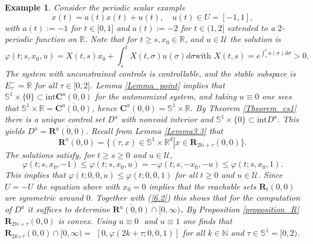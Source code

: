 \documentclass{siamltex}%
\newtheorem{example}[theorem]{Example}
\begin{document}
\begin{example}
\label{Example6.1}Consider the periodic scalar example%
\begin{equation}
\dot{x}(t)=a(t)x(t)+u(t),\quad u(t)\in U=[-1,1], \label{6.1}%
\end{equation}
with $a(t):=-1$ for $t\in\lbrack0,1]$ and $a(t):=-2$ for $t\in(1,2]$ extended
to a $2$-periodic function on $\mathbb{R}$. Note that for $t\geq s,x_{0}%
\in\mathbb{R}$, and $u\in\mathcal{U}$ the solution is%
\[
\varphi(t;s,x_{0},u)=X(t,s)x_{0}+\int_{s}^{t}X(t,\sigma)u(\sigma)d\sigma\text{
with }X(t,s)=e^{\int_{s}^{t}a(\sigma)d\sigma}>0.
\]
The system with unconstrained controls is controllable, and the stable
subspace is $E_{\tau}^{-}=\mathbb{R}$ for all $\tau\in\lbrack0,2]$. Lemma
\ref{Lemma_point} implies that $\mathbb{S}^{1}\times\{0\}\subset
\mathrm{int}\mathbf{C}^{a}(0,0)$ for the autonomized system, and taking
$u\equiv0$ one sees that $\mathbb{S}^{1}\times\mathbb{R}=\overline
{\mathbf{C}^{a}(0,0)}$, hence $\mathbf{C}^{a}(0,0)=\mathbb{S}^{1}%
\times\mathbb{R}$. By Theorem \ref{Theorem_cs1} there is a unique control set
$D^{a}$ with nonvoid interior and $\mathbb{S}^{1}\times\{0\}\subset
\mathrm{int}D^{a}$. This yields $D^{a}=\overline{\mathbf{R}^{a}(0,0)}$. Recall
from Lemma \ref{Lemma3.3} that%
\begin{equation}
\mathbf{R}^{a}(0,0)=\{(\tau,x)\in\mathbb{S}^{1}\times\mathbb{R}^{d}\left\vert
x\in\mathbf{R}_{2\mathbb{N+\tau}}(0,0)\right.  \}. \label{6.2}%
\end{equation}
The solutions satisfy, for $t\geq s\geq0$ and $u\in\mathcal{U}$,%
\[
\varphi(t;s,x_{0},-1)\leq\varphi(t;s,x_{0},u)=-\varphi(t;s,-x_{0}%
,-u)\leq\varphi(t;s,x_{0},1).
\]
This implies that $\varphi(t;0,0,u)\leq\varphi(t;0,0,1)$ for all $t\geq0$ and
$u\in\mathcal{U}$. Since $U=-U$ the equation above with $x_{0}=0$ implies that
the reachable sets $\mathbf{R}_{t}(0,0)$ are symmetric around $0$. Together
with (\ref{6.2}) this shows that for the computation of $D^{a}$ it suffices to
determine $\overline{\mathbf{R}^{a}(0,0)}\cap\lbrack0,\infty)$\textbf{.} By
Proposition \ref{proposition_R} $\mathbf{R}_{2\mathbb{N+\tau}}(0,0)$ is
convex. Using $u\equiv0\,$\ and $u\equiv1$ one finds that $\mathbf{R}%
_{2k\mathbb{+\tau}}(0,0)\cap\lbrack0,\infty)=$ $[0,\varphi(2k+\tau;0,0,1)]$
for all $k\in\mathbb{N}$ and $\tau\in\mathbb{S}^{1}=[0,2)$.


\end{example}
\end{document}
